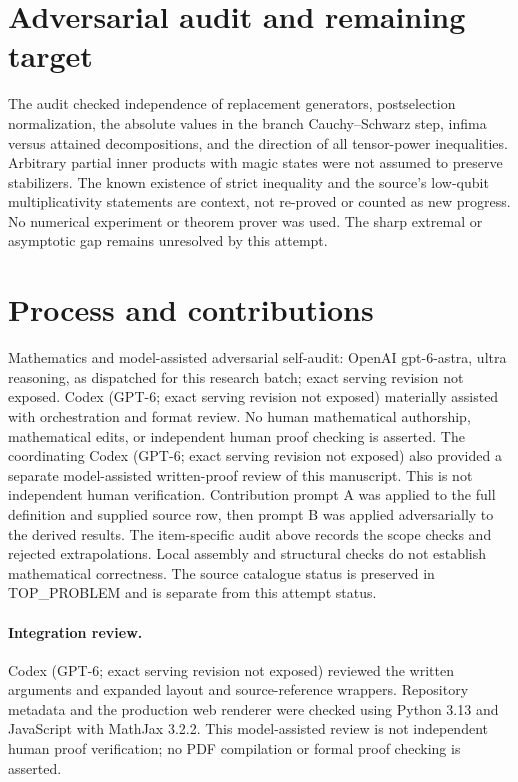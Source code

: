 \documentclass[11pt]{article}
\begin{document}
\section{Adversarial audit and remaining target}
The audit checked independence of replacement generators,
postselection normalization, the absolute values in the branch
Cauchy--Schwarz step, infima versus attained decompositions, and
the direction of all tensor-power inequalities. Arbitrary partial
inner products with magic states were not assumed to preserve
stabilizers. The known existence of strict inequality and the
source's low-qubit multiplicativity statements are context,
not re-proved or counted as new progress. No numerical experiment
or theorem prover was used. The sharp extremal or asymptotic
gap remains unresolved by this attempt.

\section{Process and contributions}
Mathematics and model-assisted adversarial self-audit: OpenAI gpt-6-astra, ultra reasoning, as dispatched for this research batch; exact serving revision not exposed. Codex (GPT-6; exact serving revision not exposed) materially assisted with orchestration and format review. No human mathematical authorship, mathematical edits, or independent human proof checking is asserted.
The coordinating Codex (GPT-6; exact serving revision not exposed) also provided a separate model-assisted written-proof review of this manuscript. This is not independent human verification.
Contribution prompt A was applied to the full definition and supplied source row, then prompt B was applied adversarially to the derived results. The item-specific audit above records the scope checks and rejected extrapolations. Local assembly and structural checks do not establish mathematical correctness. The source catalogue status is preserved in TOP\_PROBLEM and is separate from this attempt status.
\paragraph{Integration review.} Codex (GPT-6; exact serving revision not exposed) reviewed the written arguments and expanded layout and source-reference wrappers. Repository metadata and the production web renderer were checked using Python 3.13 and JavaScript with MathJax 3.2.2. This model-assisted review is not independent human proof verification; no PDF compilation or formal proof checking is asserted.
\end{document}
